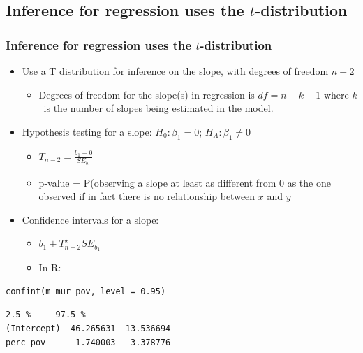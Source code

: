 \documentclass[slidestop,compress,mathserif,12pt,t,professionalfonts,xcolor=table]{beamer}
\begin{document}

\subsection{Inference for regression uses the $t$-distribution}
\label{mi4}


\begin{frame}[fragile]
\frametitle{Inference for regression uses the $t$-distribution}

\begin{itemize}

\item Use a T distribution for inference on the slope, with degrees of freedom $n - 2$
\begin{itemize}
\item Degrees of freedom for the slope(s) in regression is $df = n - k - 1$ where $k$~is the number of 
slopes being estimated in the model.
\end{itemize}

\pause

\item Hypothesis testing for a slope: $H_0: \beta_1 = 0$; $H_A: \beta_1 \ne 0$ \\
\begin{itemize}
\item $T_{n-2} = \frac{b_1 - 0}{SE_{b_1}}$
\item p-value = P(observing a slope at least as different from 0 as the one observed if in fact there is no 
relationship between $x$ and $y$
\end{itemize}

\pause

\item Confidence intervals for a slope: 
\begin{itemize}
\item $b_1 \pm T^\star_{n-2} SE_{b_1}$
\item In R:
\end{itemize}

\end{itemize}

{\scriptsize
\begin{Verbatim}[frame=single, formatcom=\color{blue}]
confint(m_mur_pov, level = 0.95)
\end{Verbatim}
}

{\scriptsize
\begin{Verbatim}[frame=single, formatcom=\color{gray}]
                 2.5 %     97.5 %
(Intercept) -46.265631 -13.536694
perc_pov      1.740003   3.378776
\end{Verbatim}
}

\end{frame}
\end{document}
